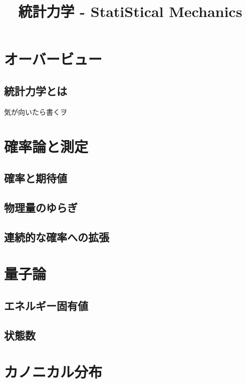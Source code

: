 \documentclass[a4paper]{jsreport}
\title{統計力学 - StatiStical Mechanics}
\begin{document}
    \maketitle

    \tableofcontents

    \chapter{オーバービュー}

        \section{統計力学とは}
            気が向いたら書くヲ

    \chapter{確率論と測定}
        \section{確率と期待値}
            

        \section{物理量のゆらぎ}


        \section{連続的な確率への拡張}

        
    \chapter{量子論}
        \section{エネルギー固有値}
        \section{状態数}

    \chapter{カノニカル分布}
        
\end{document}

